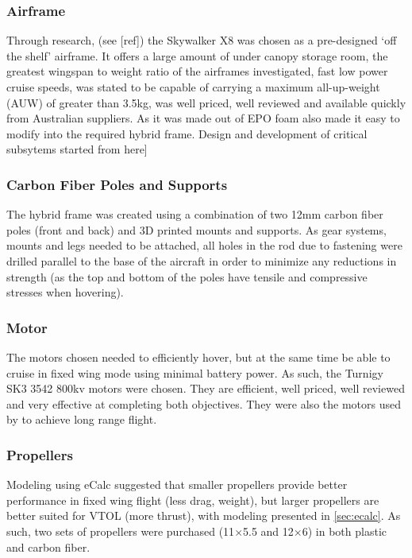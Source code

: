 \subsubsection*{Airframe}
Through research, (see [ref]) the Skywalker X8 was chosen as a pre-designed `off the shelf' airframe. It offers a large amount of under canopy storage room, the greatest wingspan to weight ratio of the airframes investigated, fast low power cruise speeds, was stated to be capable of carrying a maximum all-up-weight (AUW) of greater than 3.5kg, was well priced, well reviewed and available quickly from Australian suppliers. As it was made out of EPO foam also made it easy to modify into the required hybrid frame. Design and development of critical subsytems started from here] 
		
		
\subsubsection*{Carbon Fiber Poles and Supports}
The hybrid frame was created using a combination of two 12mm carbon fiber poles (front and back) and 3D printed mounts and supports. As gear systems, mounts and legs needed to be attached, all holes in the rod due to fastening were drilled parallel to the base of the aircraft in order to minimize any reductions in strength (as the top and bottom of the poles have tensile and compressive stresses when hovering).
	
\subsubsection*{Motor}
The motors chosen needed to efficiently hover, but at the same time be able to cruise in fixed wing mode using minimal battery power. As such, the Turnigy SK3 3542 800kv motors were chosen. They are efficient, well priced, well reviewed and very effective at completing both objectives. They were also the motors used by  to achieve long range flight.
	
\subsubsection*{Propellers}
Modeling using eCalc suggested that smaller propellers provide better performance in fixed wing flight (less drag, weight), but larger propellers are better suited for VTOL (more thrust), with modeling presented in \ref{sec:ecalc}. As such, two sets of propellers were purchased (11$\times$5.5 and 12$\times$6) in both plastic and carbon fiber.
	
